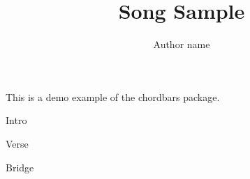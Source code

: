 \documentclass[11pt]{article}
\title{Song Sample}
\author{Author name}
\begin{document}
\maketitle

This is a demo example of the chordbars package.

\begin{chordbar}{4}{1}{Intro}
\end{chordbar}


\begin{chordbar}{8}{2}{Verse}
\end{chordbar}

\begin{chordbar}{8}{1}{Bridge}
\end{chordbar}
\end{document}
